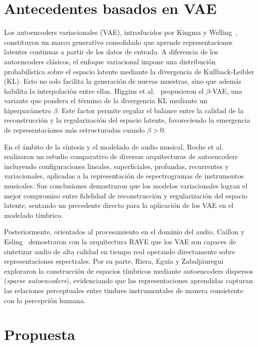 \documentclass[12pt,a4paper,twoside]{tesis}
\begin{document}
\newpage
\section{Antecedentes basados en VAE}

Los autoencoders variacionales (VAE), introducidos por Kingma y Welling~\cite{kingma2013auto}, constituyen un marco generativo consolidado que aprende representaciones latentes continuas a partir de los datos de entrada. A diferencia de los autoencoders clásicos, el enfoque variacional impone una distribución probabilística sobre el espacio latente mediante la divergencia de Kullback-Leibler (KL). Esto no solo facilita la generación de nuevas muestras, sino que además habilita la interpolación entre ellas. Higgins et al.~\cite{higgins2017beta} propusieron el $\beta$-VAE, una variante que pondera el término de la divergencia KL mediante un hiperparámetro $\beta$. Este factor permite regular el balance entre la calidad de la reconstrucción y la regularización del espacio latente, favoreciendo la emergencia de representaciones más estructuradas cuando $\beta > 0$.

En el ámbito de la síntesis y el modelado de audio musical, Roche et al.~\cite{roche2019autoencodersmusicsoundmodeling} realizaron un estudio comparativo de diversas arquitecturas de autoencoders incluyendo configuraciones lineales, superficiales, profundas, recurrentes y variacionales, aplicadas a la representación de espectrogramas de instrumentos musicales. Sus conclusiones demostraron que los modelos variacionales logran el mejor compromiso entre fidelidad de reconstrucción y regularización del espacio latente, sentando un precedente directo para la aplicación de los VAE en el modelado tímbrico.

Posteriormente, orientados al procesamiento en el dominio del audio, Caillon y Esling~\cite{caillon2021rave} demostraron con la arquitectura RAVE que los VAE son capaces de sintetizar audio de alta calidad en tiempo real operando directamente sobre representaciones espectrales. Por su parte, Riera, Eguía y Zabaljáuregui~\cite{riera2017timbre} exploraron la construcción de espacios tímbricos mediante autoencoders dispersos (\textit{sparse autoencoders}), evidenciando que las representaciones aprendidas capturan las relaciones perceptuales entre timbres instrumentales de manera consistente con la percepción humana.



\newpage
\section{Propuesta}
\end{document}

